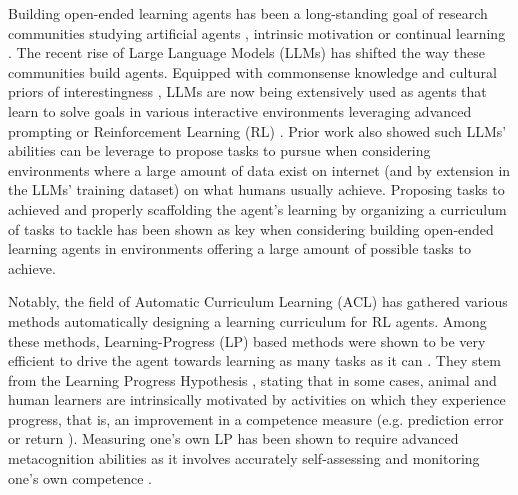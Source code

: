 Building open-ended learning agents has been a long-standing goal of research communities studying artificial agents \cite{schmidhuber_powerplay_2013}, intrinsic motivation \cite{} or continual learning \cite{}. The recent rise of Large Language Models (LLMs) has shifted the way these communities build agents. Equipped with commonsense knowledge and cultural priors of interestingness \cite{zhang_omni_2024,klissarov_motif_2023,du_guiding_2023}, LLMs are now being extensively used as agents that learn to solve goals in various interactive environments leveraging advanced prompting or Reinforcement Learning (RL) \citep{yao_react_2022,wang_jarvis-1_2023,wang_voyager_2023,abdulhai_lmrl_2023,carta_grounding_2023,wen_reinforcing_2024,zhai_fine-tuning_2024,zhou_archer_2024}. Prior work also showed such LLMs' abilities can be leverage to propose tasks to pursue \cite{wang_voyager_2023,colas_augmenting_2023,pourcel_aces_2024} when considering environments where a large amount of data exist on internet (and by extension in the LLMs' training dataset) on what humans usually achieve. Proposing tasks to achieved and properly scaffolding the agent's learning by organizing a curriculum of tasks to tackle has been shown as key \cite{jiang_learning_2023} when considering building open-ended learning agents in environments offering a large amount of possible tasks to achieve. 

Notably, the field of Automatic Curriculum Learning (ACL) \cite{portelas_automatic_2019} has gathered various methods automatically designing a learning curriculum for RL agents. Among these methods, Learning-Progress (LP) based methods were shown to be very efficient to drive the agent towards learning as many tasks as it can \cite{baranes_r-iac_2009,portelas_teacher_2019,kanitscheider_multi-task_2021}. They stem from the Learning Progress Hypothesis \cite{kaplan_search_2007}, stating that in some cases, animal and human learners are intrinsically motivated by activities on which they experience progress, that is, an improvement in a competence measure (e.g. prediction error \cite{schmidhuber_curious_1991} or return \cite{portelas_teacher_2019}). Measuring one's own LP has been shown to require advanced metacognition abilities as it involves accurately self-assessing and monitoring one's own competence \cite{abdelghani_guiding_2024,murayama_process_2019,ten_role_2022}.

